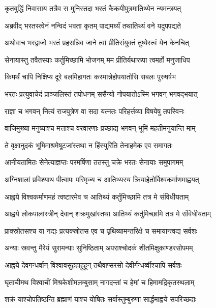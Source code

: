 
\twolineshloka
{कृतबुद्धिं निवासाय तत्रैव स मुनिस्तदा}
{भरतं कैकयीपुत्रमातिथ्येन न्यमन्त्रयत्} %

\twolineshloka
{अब्रवीद् भरतस्त्वेनं नन्विदं भवता कृतम्}
{पाद्यमर्घ्यं तथातिथ्यं वने यदुपपद्यते} %

\twolineshloka
{अथोवाच भरद्वाजो भरतं प्रहसन्निव}
{जाने त्वां प्रीतिसंयुक्तं तुष्येस्त्वं येन केनचित्} %

\twolineshloka
{सेनायास्तु तवैतस्याः कर्तुमिच्छामि भोजनम्}
{मम प्रीतिर्यथारूपा त्वमर्हो मनुजाधिप} %

\twolineshloka
{किमर्थं चापि निक्षिप्य दूरे बलमिहागतः}
{कस्मान्नेहोपयातोसि सबलः पुरुषर्षभ} %

\twolineshloka
{भरतः प्रत्युवाचेदं प्राञ्जलिस्तं तपोधनम्}
{ससैन्यो नोपयातोऽस्मि भगवन् भगवद्भयात्} %

\twolineshloka
{राज्ञा च भगवन् नित्यं राजपुत्रेण वा सदा}
{यत्नतः परिहर्त्तव्या विषयेषु तपस्विनः} %

\twolineshloka
{वाजिमुख्या मनुष्याश्च मत्ताश्च वरवारणाः}
{प्रच्छाद्य भगवन् भूमिं महतीमनुयान्ति माम्} %

\twolineshloka
{ते वृक्षानुदकं भूमिमाश्रमेषूटजांस्तथा}
{न हिंस्युरिति तेनाहमेक एव समागतः} %

\twolineshloka
{आनीयतामितः सेनेत्याज्ञप्तः परमर्षिणा}
{ततस्तु चक्रे भरतः सेनायाः समुपागमम्} %

\twolineshloka
{अग्निशालां प्रविश्याथ पीत्वापः परिमृज्य च}
{आतिथ्यस्य क्रियाहेतोर्विश्वकर्माणमाह्वयत्} %

\twolineshloka
{आह्वये विश्वकर्माणमहं त्वष्टारमेव च}
{आतिथ्यं कर्तुमिच्छामि तत्र मे संविधीयताम्} %

\twolineshloka
{आह्वये लोकपालांस्त्रीन् देवान् शक्रमुखांस्तथा}
{आतिथ्यं कर्तुमिच्छामि तत्र मे संविधीयताम्} %

\twolineshloka
{प्राक्स्रोतसश्च या नद्यः प्रत्यक्स्रोतस एव च}
{पृथिव्यामन्तरिक्षे च समायान्त्वद्य सर्वशः} %

\twolineshloka
{अन्याः स्रवन्तु मैरेयं सुरामन्याः सुनिष्ठिताम्}
{अपराश्चोदकं शीतमिक्षुकाण्डरसोपमम्} %

\twolineshloka
{आह्वये देवगन्धर्वान् विश्वावसुहहाहुहून्}
{तथैवाप्सरसो देवीर्गन्धर्व्वीश्चापि सर्वशः} %

\twolineshloka
{घृताचीमथ विश्वाचीं मिश्रकेशीमलम्बुसाम्}
{नागदन्तां च हेमां च हिमामद्रिकृतस्थलाम्} %

\twolineshloka
{शक्रं याश्चोपतिष्ठन्ति ब्रह्माणं याश्च योषितः}
{सर्वास्तुम्बुरुणा सार्द्धमाह्वये सपरिच्छदाः} %

